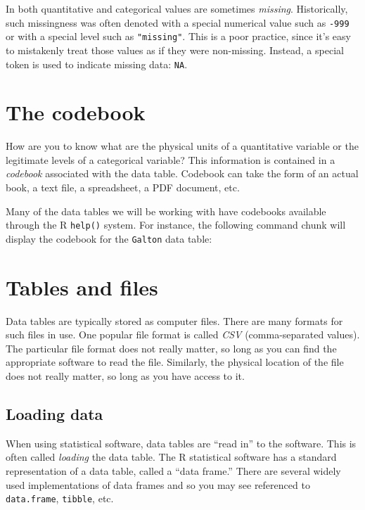 \documentclass[]{book}
\theoremstyle{definition}
\theoremstyle{definition}
\theoremstyle{definition}
\theoremstyle{remark}
\begin{document}
In both quantitative and categorical values are sometimes
\emph{missing}. Historically, such missingness was often denoted with a
special numerical value such as \texttt{-999} or with a special level
such as \texttt{"missing"}. This is a poor practice, since it's easy to
mistakenly treat those values as if they were non-missing. Instead, a
special token is used to indicate missing data: \texttt{NA}.

\section{The codebook}\label{the-codebook}

How are you to know what are the physical units of a quantitative
variable or the legitimate levels of a categorical variable? This
information is contained in a \emph{codebook} associated with the data
table. Codebook can take the form of an actual book, a text file, a
spreadsheet, a PDF document, etc.

Many of the data tables we will be working with have codebooks available
through the R \texttt{help()} system. For instance, the following
command chunk will display the codebook for the \texttt{Galton} data
table:

\section{Tables and files}\label{tables-and-files}

Data tables are typically stored as computer files. There are many
formats for such files in use. One popular file format is called
\emph{CSV} (comma-separated values). The particular file format does not
really matter, so long as you can find the appropriate software to read
the file. Similarly, the physical location of the file does not really
matter, so long as you have access to it.

\subsection{Loading data}\label{loading-data}

When using statistical software, data tables are ``read in'' to the
software. This is often called \emph{loading} the data table. The R
statistical software has a standard representation of a data table,
called a ``data frame.'' There are several widely used implementations
of data frames and so you may see referenced to \texttt{data.frame},
\texttt{tibble}, etc.
\end{document}
